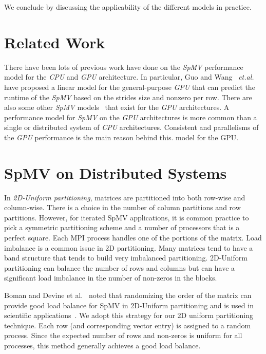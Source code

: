 \documentclass[conference, 10ppt]{IEEEtran}
\begin{document}
We conclude by discussing the applicability of the different models in
practice.

\section{Related Work}

There have been lots of previous work have done on the \textit{SpMV}
performance model for the \textit{CPU} and \textit{GPU}
architecture. In particular, Guo and Wang~\cite{guo2013performance}
\textit{et.al.} have proposed a linear model for the general-purpose
\textit{GPU} that can predict the runtime of the \textit{SpMV} based
on the strides size and nonzero per row. There are also some other
\textit{SpMV} models~\cite{nisa2018effective,guo2018performance} that
exist for the \textit{GPU} architectures. A performance model for
\textit{SpMV} on the \textit{GPU} architectures is more common than a
single or distributed system of \textit{CPU} architectures. Consistent
and parallelisms of the \textit{GPU} performance is the main reason
behind this.
model for the GPU. 

\section{SpMV on Distributed Systems}
In \textit{2D-Uniform partitioning},  matrices
are partitioned into both row-wise and column-wise.  There is a choice
in the number of column partitions and row partitions. However, for
iterated SpMV applications, it is common practice to pick a symmetric
partitioning scheme and a number of processors that is a perfect
square. Each MPI process handles one of the portions of the matrix.
Load imbalance is a common issue in 2D partitioning. Many matrices
tend to have a band structure that tends to build very imbalanced
partitioning.  2D-Uniform partitioning can balance the number of rows
and columns but can have a significant load imbalance in the number
of non-zeros in the blocks.

Boman and Devine et al.~\cite{boman2013scalable} noted that
randomizing the order of the matrix can provide good load balance for
SpMV in 2D-Uniform partitioning and is used in scientific
applications~\cite{dytrych2016efficacy}. We adopt this strategy for
our 2D uniform partitioning technique. Each row (and corresponding
vector entry) is assigned to a random process.  Since the expected
number of rows and non-zeros is uniform for all processes, this method
generally achieves a good load balance.
\end{document}
